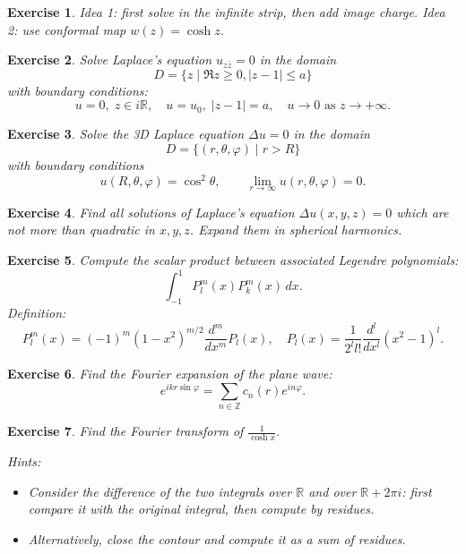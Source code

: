 \documentclass[11pt,a4paper]{article}
\newtheorem*{exercise}{Exercise}
\begin{document}
{\begin{exercise}
	\textit{Idea 1:} first solve in the infinite strip, then add image charge.  
	\textit{Idea 2:} use conformal map $w(z) = \cosh z$.
\end{exercise}

\begin{exercise}
	Solve Laplace’s equation $u_{z\bar{z}} = 0$ in the domain
	\[
	D = \{z \mid \Re z \ge 0, |z - 1| \le a\}
	\]
	with boundary conditions:
	\[
	u = 0, \; z \in i\mathbb{R}, \quad
	u = u_0, \; |z - 1| = a, \quad
	u \to 0 \text{ as } z \to +\infty.
	\]
\end{exercise}

\begin{exercise}
	Solve the 3D Laplace equation $\Delta u = 0$ in the domain
	\[
	D = \{(r, \theta, \varphi) \mid r > R\}
	\]
	with boundary conditions
	\[
	u(R, \theta, \varphi) = \cos^2\theta, \qquad \lim_{r \to \infty} u(r, \theta, \varphi) = 0.
	\]
\end{exercise}

\begin{exercise}
	Find all solutions of Laplace’s equation $\Delta u(x, y, z) = 0$ which are not more than quadratic in $x, y, z$.  
	Expand them in spherical harmonics.
\end{exercise}

\begin{exercise}
	Compute the scalar product between associated Legendre polynomials:
	\[
	\int_{-1}^{1} P_l^m(x) P_k^m(x)\,dx.
	\]
	Definition:
	\[
	P_l^m(x) = (-1)^m (1 - x^2)^{m/2} \frac{d^m}{dx^m} P_l(x), \quad
	P_l(x) = \frac{1}{2^l l!} \frac{d^l}{dx^l}(x^2 - 1)^l.
	\]
\end{exercise}

\begin{exercise}
	Find the Fourier expansion of the plane wave:
	\[
	e^{ikr\sin\varphi} = \sum_{n\in\mathbb{Z}} c_n(r)e^{in\varphi}.
	\]
\end{exercise}
}


\begin{exercise}
	Find the Fourier transform of $\frac{1}{\cosh x}$.
	
	\textit{Hints:}
	\begin{itemize}
		\item Consider the difference of the two integrals over $\mathbb{R}$ and over $\mathbb{R} + 2\pi i$: first compare it with the original integral, then compute by residues.
		\item Alternatively, close the contour and compute it as a sum of residues.
	\end{itemize}
\end{exercise}
\end{document}
